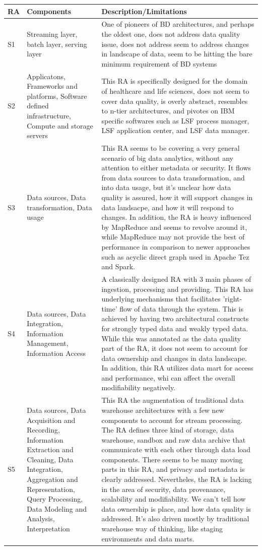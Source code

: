 \documentclass[review]{elsarticle}
\begin{document}
\begin{table}[h!]
    \begin{tabular}{ |p{0.5cm}|p{3cm}|p{7.5cm}| }
        \hline
        RA & Components & Description/Limitations \\ 
        \hline
        S1 & Streaming layer, batch layer, serving layer & One of pioneers of BD architectures, and perhaps the oldest one, does not address data quality issue, does not address seem to address changes in landscape of data, seem to be hitting the bare minimum requirement of BD systems  \\
        \hline
        S2 & Applicatons, Frameworks and platforms, Software defined infrastructure, Compute and storage servers & This RA is specifically designed for the domain of healthcare and life sciences, does not seem to cover data quality, is overly abstract, resembles to n-tier architectures, and pivotes on IBM specific softwares such as LSF process manager, LSF application center, and LSF data manager. \\
        \hline
        S3 & Data sources, Data transformation, Data usage & This RA seems to be covering a very general scenario of big data analytics, without any attention to either metadata or security. It flows from data sources to data transformation, and into data usage, but it's unclear how data quality is assured, how it will support changes in data landsacpe, and how it will respond to changes. In addition, the RA is heavy influenced by MapReduce and seems to revolve around it, while MapReduce may not provide the best of performance in comparison to newer approaches such as acyclic direct graph used in Apache Tez and Spark.  \\
        \hline
        S4 & Data sources, Data Integration, Information Management, Information Access & A classically designed RA with 3 main phases of ingestion, processing and providing. This RA has underlying mechanisms that facilitates 'right-time' flow of data through the system. This is achieved by having two architectural constructs for strongly typed data and weakly typed data. While this was annotated as the data quality part of the RA, it does not seem to account for data ownership and changes in data landscape. In addition, this RA utilizes data mart for access and performance, whi can affect the overall modifiability negatively.   \\
        \hline
        S5 & Data sources, Data Acquisition and Recording, Information Extraction and Cleaning, Data Integration, Aggregation and Representation, Query Processing, Data Modeling and Analysis, Interpretation & This RA the augmentation of traditional data warehouse architectures with a few new components to account for stream processing. The RA defines three kind of storage, data warehouse, sandbox and raw data archive that communicate with each other through data load components. There seems to be many moving parts in this RA, and privacy and metadata is clearly addressed. Nevertheles, the RA is lacking in the area of security, data provenance, scalability and modifiability. We can't tell how data ownership is place, and how data quality is addressed. It's also driven mostly by traditional warehouse way of thinking, like staging environments and data marts.  \\

\end{tabular}
\end{table}
\end{document}
